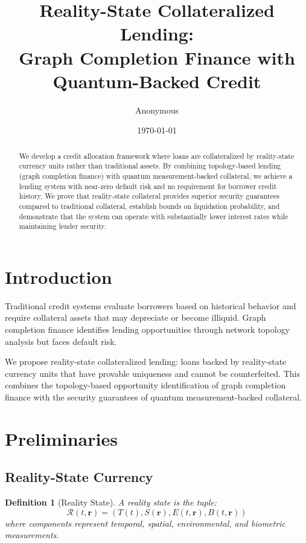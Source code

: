 \documentclass[12pt]{article}
\title{Reality-State Collateralized Lending:\\
Graph Completion Finance with Quantum-Backed Credit}
\author{Anonymous}
\date{\today}
\newtheorem{definition}[theorem]{Definition}
\begin{document}
\maketitle

\begin{abstract}
We develop a credit allocation framework where loans are collateralized by reality-state currency units rather than traditional assets. By combining topology-based lending (graph completion finance) with quantum measurement-backed collateral, we achieve a lending system with near-zero default risk and no requirement for borrower credit history. We prove that reality-state collateral provides superior security guarantees compared to traditional collateral, establish bounds on liquidation probability, and demonstrate that the system can operate with substantially lower interest rates while maintaining lender security.
\end{abstract}

\section{Introduction}

Traditional credit systems evaluate borrowers based on historical behavior and require collateral assets that may depreciate or become illiquid. Graph completion finance identifies lending opportunities through network topology analysis but faces default risk.

We propose reality-state collateralized lending: loans backed by reality-state currency units that have provable uniqueness and cannot be counterfeited. This combines the topology-based opportunity identification of graph completion finance with the security guarantees of quantum measurement-backed collateral.

\section{Preliminaries}

\subsection{Reality-State Currency}

\begin{definition}[Reality State]
A reality state is the tuple:
$$
\mathcal{R}(t,\mathbf{r}) = (T(t), S(\mathbf{r}), E(t,\mathbf{r}), B(t,\mathbf{r}))
$$
where components represent temporal, spatial, environmental, and biometric measurements.
\end{definition}
\end{document}
